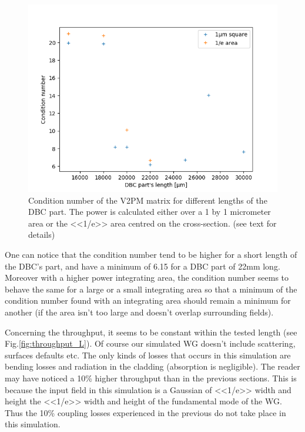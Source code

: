 \begin{figure}[htbp]
  \centering
  \includegraphics[scale=.5]{picture/geometry/CondNvsL.png}
  \caption{Condition number of the V2PM matrix for different lengths
    of the DBC part. The power is calculated either over a 1 by 1
    micrometer area or the <<1/e>> area centred on the
    cross-section. (see text for details)}
  \label{fig:length}
\end{figure}
One can notice that the condition number tend to be higher
for a short length of the DBC's part, and have a minimum of 6.15 for a
DBC part of 22mm
long. Moreover with a higher power integrating area, the condition number
seems to behave the same for a large or a small integrating area so
that a minimum of the condition number found with an integrating area
should remain a minimum for another (if the area isn't too large and
doesn't overlap surrounding fields).

Concerning the throughput, it seems to be constant within the tested
length (see Fig.\ref{fig:throughput_L}). Of course our simulated WG doesn't include scattering, surfaces defaults etc. The only kinds of losses that occurs
in this simulation are bending losses and
radiation in the cladding (absorption is negligible). The reader may have noticed a 10\% higher
throughput than in the previous sections. This is because the input
field in this simulation is a Gaussian of <<1/e>> width and height the
<<1/e>> width and height of the fundamental mode of the WG. Thus the
10\% coupling losses experienced in the previous do not take place in
this simulation.


